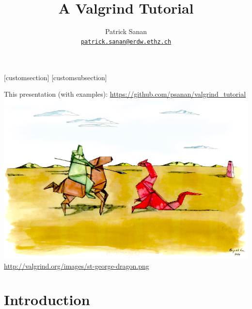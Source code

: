 \documentclass{beamer}
\author[Patrick Sanan]{Patrick Sanan \\ \href{mailto:patrick.sanan@erdw.ethz.ch}{\texttt{patrick.sanan@erdw.ethz.ch}}}
\title{A Valgrind Tutorial}
\date[]{}
\begin{document}
[customsection]
[customsubsection]


\begin{frame}[fragile]
\titlepage
\begin{center}
This presentation (with examples): \url{https://github.com/psanan/valgrind_tutorial} \\
\includegraphics[height=0.25\textheight]{st-george-dragon.png}\\
{\tiny \url{http://valgrind.org/images/st-george-dragon.png}}
\end{center}
\end{frame}

\section{Introduction}
\end{document}
